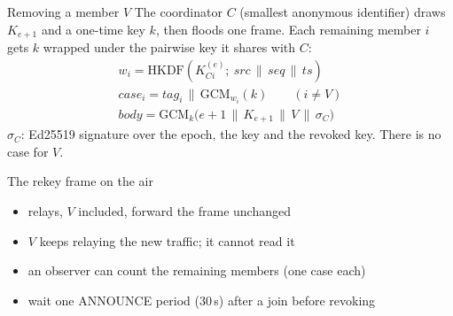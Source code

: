 \documentclass[aspectratio=169,11pt]{beamer}
\begin{document}
\begin{frame}{Removing a member $V$}
The coordinator $C$ (smallest anonymous identifier) draws $K_{e+1}$ and a
one-time key $k$, then floods one frame. Each remaining member $i$ gets
$k$ wrapped under the pairwise key it shares with $C$:
\begin{gather*}
w_i = \mathrm{HKDF}(K_{Ci}^{(e)};\ \mathit{src}\,\|\,\mathit{seq}\,\|\,\mathit{ts})\\
\mathit{case}_i = \mathit{tag}_i \,\|\, \mathrm{GCM}_{w_i}(k) \qquad (i\neq V)\\
\mathit{body} = \mathrm{GCM}_k\big(e{+}1 \,\|\, K_{e+1} \,\|\, V \,\|\, \sigma_C\big)
\end{gather*}
{\small $\sigma_C$: Ed25519 signature over the epoch, the key and the revoked key.
There is no case for $V$.}
\end{frame}

\begin{frame}{The rekey frame on the air}
\centering
{}
\vspace{7mm}
\begin{itemize}
  \item relays, $V$ included, forward the frame unchanged
  \item $V$ keeps relaying the new traffic; it cannot read it
  \item an observer can count the remaining members (one case each)
  \item wait one ANNOUNCE period (30\,s) after a join before revoking
\end{itemize}
\end{frame}
\end{document}
